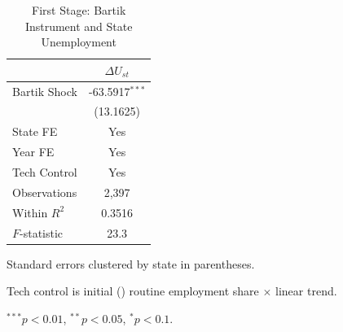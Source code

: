 \begin{table}[htbp]
\centering
\caption{First Stage: Bartik Instrument and State Unemployment}
\label{tab:firststage}
\begin{tabular}{lc}
\hline\hline
& $\Delta U_{st}$ \\
\hline
Bartik Shock & -63.5917$^{***}$ \\
& (13.1625) \\[6pt]
\hline
State FE & Yes \\
Year FE & Yes \\
Tech Control & Yes \\
Observations & 2,397 \\
Within $R^2$ & 0.3516 \\
$F$-statistic & 23.3 \\
\hline\hline
\end{tabular}
\begin{tablenotes}\small
\item Standard errors clustered by state in parentheses.
\item Tech control is initial ({\statsBaseYear}) routine employment share $\times$ linear trend.
\item $^{***}p<0.01$, $^{**}p<0.05$, $^{*}p<0.1$.
\end{tablenotes}
\end{table}